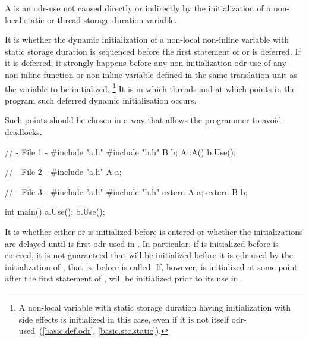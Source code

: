 \pnum
{}%
A 
is an odr-use not caused directly or indirectly by
the initialization of a non-local static or thread storage duration variable.

\pnum
{}%
It is 
whether the dynamic initialization of a
non-local non-inline variable with static storage duration
is sequenced before the first statement of  or is deferred.
If it is deferred, it strongly happens before
any non-initialization odr-use
of any non-inline function or non-inline variable
defined in the same translation unit as the variable to be initialized.%
\footnote{A non-local variable with static storage duration
having initialization
with side effects is initialized in this case,
even if it is not itself odr-used~(\ref{basic.def.odr}, \ref{basic.stc.static}).}
It is 
in which threads and at which points in the program such deferred dynamic initialization occurs.
\begin{note}
Such points should be chosen in a way that allows the programmer to avoid deadlocks.
\end{note}
\begin{example}
\begin{codeblock}
// - File 1 -
#include "a.h"
#include "b.h"
B b;
A::A(){
  b.Use();
}

// - File 2 -
#include "a.h"
A a;

// - File 3 -
#include "a.h"
#include "b.h"
extern A a;
extern B b;

int main() {
  a.Use();
  b.Use();
}
\end{codeblock}

It is 
whether either  or  is
initialized before  is entered or whether the
initializations are delayed until  is first odr-used in
. In particular, if  is initialized before
 is entered, it is not guaranteed that  will be
initialized before it is odr-used by the initialization of , that
is, before  is called. If, however,  is initialized
at some point after the first statement of ,  will
be initialized prior to its use in .
\end{example}

